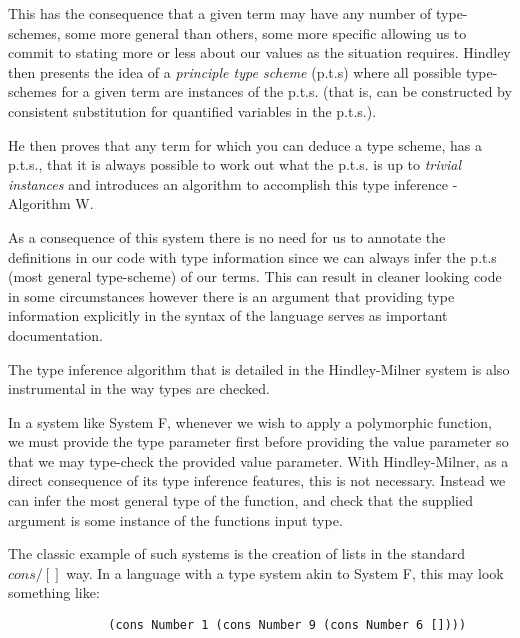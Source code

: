 \documentclass{ProgressReport}[2020/09/15]
\begin{document}
            This has the consequence that a given term may have any number of
            type-schemes, some more general than others, some more specific
            allowing us to commit to stating more or less about our
            values as the situation requires. Hindley then presents
            the idea of a \textit{principle type scheme} (p.t.s) where
            all possible type-schemes for a given term are instances
            of the p.t.s. (that is, can be constructed by consistent
            substitution for quantified variables in the p.t.s.).
            
            He then proves that any term for which you can deduce a type scheme,
            has a p.t.s., that it is always possible to work out what the p.t.s. is
            up to \textit{trivial instances} and introduces an
            algorithm to accomplish this type inference - Algorithm W.

            As a consequence of this system there is no need for us to
            annotate the definitions in our code with type
            information since we can always infer the p.t.s (most
            general type-scheme) of our terms. This can result
            in cleaner looking code in some circumstances however
            there is an argument that providing type information
            explicitly in the syntax of the language serves as
            important documentation.
            
            The type inference algorithm that is detailed in the Hindley-Milner
            system is also instrumental in the way types are checked.
            
            In a system like System F, whenever we wish to apply a polymorphic
            function, we must provide the type parameter first before providing
            the value parameter so that we may type-check the provided value
            parameter. With Hindley-Milner, as a direct consequence of its type
            inference features, this is not necessary. Instead we can infer the
            most general type of the function, and check that the supplied
            argument is some instance of the functions input type.
            
            The classic example of such systems is the creation of lists in the
            standard $cons/[]$ way. In a language with a type system akin to
            System F, this may look
            something like:
            
            \begin{verbatim}
              (cons Number 1 (cons Number 9 (cons Number 6 [])))  
            \end{verbatim}
            
\end{document}
